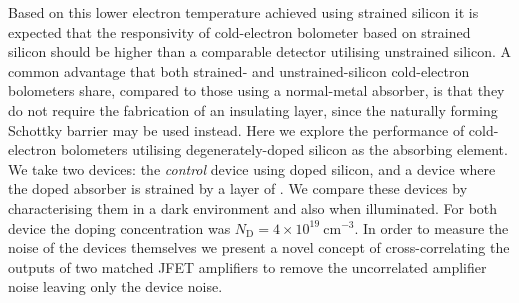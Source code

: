 \documentclass[final]{svjour2}
\begin{document}
Based on this lower electron temperature achieved using strained silicon it is expected that the responsivity of cold-electron bolometer based on strained silicon should be higher than a comparable detector utilising unstrained silicon. A common advantage that both strained- and unstrained-silicon cold-electron bolometers share, compared to those using a normal-metal absorber, is that they do not require the fabrication of an insulating layer, since the naturally forming Schottky barrier may be used instead. Here we explore the performance of cold-electron bolometers utilising degenerately-doped silicon as the absorbing element. We take two devices: the \textit{control} device using doped silicon, and a device where the doped absorber is strained by a layer of . We compare these devices by characterising them in a dark environment and also when illuminated. For both device the doping concentration was $N_{\mathrm{D}} = 4\times 10^{19}~\mathrm{cm^{-3}}$. In order to measure the noise of the devices themselves we present a novel concept of cross-correlating the outputs of two matched JFET amplifiers to remove the uncorrelated amplifier noise leaving only the device noise.
%
\end{document}
